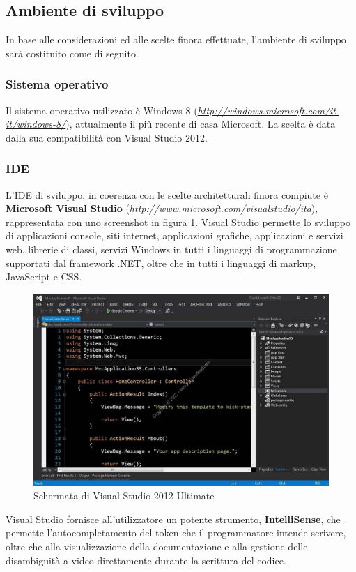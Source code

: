 \subsection{Ambiente di sviluppo}
In base alle considerazioni ed alle scelte finora effettuate, l'ambiente di sviluppo sarà costituito come di seguito.

\subsubsection{Sistema operativo}
Il sistema operativo utilizzato è Windows 8 (\emph{\url{http://windows.microsoft.com/it-it/windows-8/}}), attualmente il più recente di casa Microsoft.
La scelta è data dalla sua compatibilità con Visual Studio 2012.

\subsubsection{IDE}
L'IDE di sviluppo, in coerenza con le scelte architetturali finora compiute è \textbf{Microsoft Visual Studio} (\emph{\url{http://www.microsoft.com/visualstudio/ita}}), rappresentata con uno screenshot in figura \ref{vsimage}.
Visual Studio permette lo sviluppo di applicazioni console, siti internet, applicazioni grafiche, applicazioni e servizi web, librerie di classi, servizi Windows in tutti i linguaggi di programmazione supportati dal framework .NET, oltre che in tutti i linguaggi di markup, JavaScript e CSS.

\begin{figure}
\begin{center}

\includegraphics[scale=0.3]{imgs/visualstudio.jpg} 
\caption{Schermata di Visual Studio 2012 Ultimate\label{vsimage}}
\end{center}

\end{figure}
Visual Studio fornisce all’utilizzatore un potente strumento, \textbf{IntelliSense}, che permette
l'autocompletamento del token che il programmatore intende scrivere, oltre che
alla visualizzazione della documentazione e alla gestione delle disambiguità a
video direttamente durante la scrittura del codice.

